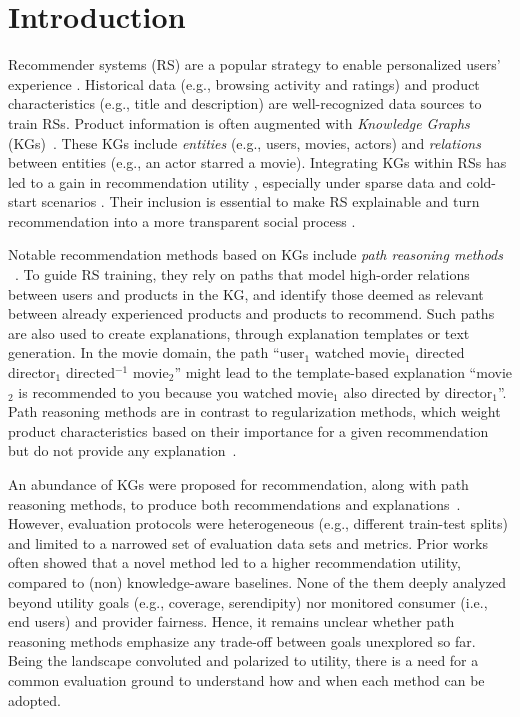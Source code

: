 \documentclass[runningheads]{llncs}
\begin{document}
\section{Introduction}
Recommender systems (RS) are a popular strategy to enable personalized users' experience \cite{ricci}.
Historical data (e.g., browsing activity and ratings) and product characteristics (e.g., title and description) are well-recognized data sources to train RSs. 
Product information is often augmented with \emph{Knowledge Graphs} (KGs)~\cite{cao-etal-2018-neural,10.1145/2926718}. 
These KGs include \emph{entities} (e.g., users, movies, actors) and \emph{relations} between entities (e.g., an actor starred a movie). 
Integrating KGs within RSs has led to a gain in recommendation utility \cite{kgat, ripple}, especially under sparse data and cold-start scenarios \cite{9251221}. 
Their inclusion is essential to make RS explainable and turn recommendation into a more transparent social process \cite{explainable-recsys-survey,Tintarev2007}.

Notable recommendation methods based on KGs include \emph{path reasoning methods}
~\cite{cfkg,10.1609/aaai.v33i01.33015329,ma2019jointly,kprn,ni-etal-2019-justifying,musto2021generating,pgpr,Song2019EkarAE,leveraging-demostrations}. 
To guide RS training, they rely on paths that model high-order relations between users and products in the KG,
and identify those deemed as relevant between already experienced products and products to recommend.  
Such paths are also used to create explanations, through explanation templates or text generation. 
In the movie domain, the path “user$_1$ watched movie$_1$ directed director$_1$ directed$^{-1}$ movie$_2$” might lead to 
the template-based explanation “movie$_2$ is recommended to you because you watched movie$_1$ also directed by director$_1$”.
Path reasoning methods are in contrast to regularization methods, which weight product characteristics based on their importance for a given recommendation
but do not provide any explanation~\cite{cke,deepcon,sequentialmemorykg,he2020mining, ripple, kgat}. 

An abundance of KGs were proposed for recommendation, along with path reasoning methods, to produce both recommendations and explanations~\cite{arrieta2019explainable}.
However, evaluation protocols were heterogeneous (e.g., different train-test splits) and limited to a narrowed set of evaluation data sets and metrics. 
Prior works often showed that a novel method led to a higher recommendation utility, compared to (non) knowledge-aware baselines. 
None of the them deeply analyzed beyond utility goals (e.g., coverage, serendipity) nor monitored consumer (i.e., end users) and provider fairness.
Hence, it remains unclear whether path reasoning methods emphasize any trade-off between goals unexplored so far. 
Being the landscape convoluted and polarized to utility, there is a need for a common evaluation ground to understand how and when each method can be adopted.
\end{document}
